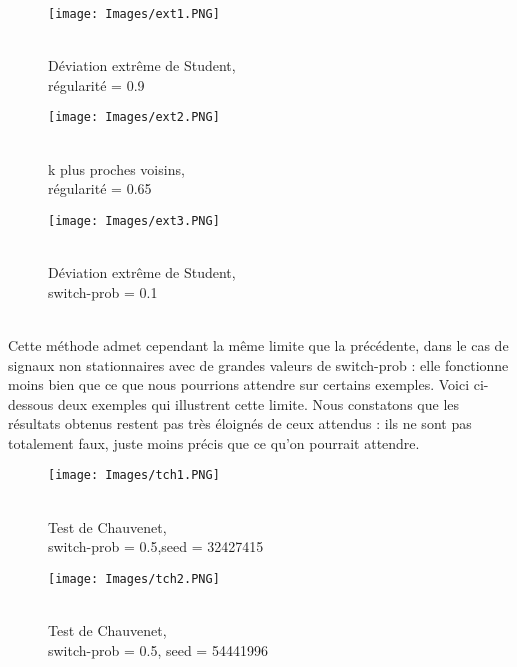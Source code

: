 \documentclass[a4paper,12pt]{article} %
\begin{document}
                \begin{figure}[H] %
                \texttt{[image: Images/ext1.PNG]} %
                \caption{\\Déviation extrême de Student,\\ régularité = 0.9} %
                \label{m15} %
                \endminipage
                \hfill
                \endminipage
                \texttt{[image: Images/ext2.PNG]}
                \caption{\\k plus proches voisins,\\ régularité = 0.65}
                \label{m5}
                \endminipage
                \hfill
                \endminipage
                \texttt{[image: Images/ext3.PNG]}  
                
                \caption{\\Déviation extrême de Student,\\ switch-prob = 0.1}
                
                \label{m35}
                \endminipage
                \end{figure}
                \\
                Cette méthode admet cependant la même limite que la précédente, dans le cas de signaux non stationnaires avec de grandes valeurs de switch-prob : elle fonctionne moins bien que ce que nous pourrions attendre sur certains exemples. Voici ci-dessous deux exemples qui illustrent cette limite. Nous constatons que les résultats obtenus restent pas très éloignés de ceux attendus : ils ne sont pas totalement faux, juste moins précis que ce qu'on pourrait attendre.
                \begin{figure}[H] %
                \texttt{[image: Images/tch1.PNG]} %
                \caption{\\Test de Chauvenet,\\switch-prob = 0.5,seed = 32427415} %
                \label{m15} %
                \endminipage
                \texttt{[image: Images/tch2.PNG]}  
                \caption{\\Test de Chauvenet,\\switch-prob = 0.5, seed = 54441996}
                \label{m5}
                \endminipage
                \end{figure}
            
\end{document}
